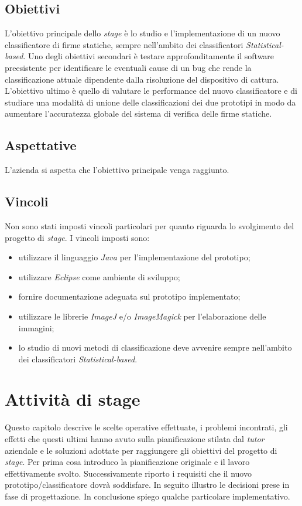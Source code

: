 \subsection{Obiettivi}
\label{2.2}
L'obiettivo principale dello \emph{stage} è lo studio e l'implementazione di un nuovo classificatore di firme statiche, sempre nell'ambito dei classificatori \emph{Statistical-based}. Uno degli obiettivi secondari è testare approfonditamente il software preesistente per identificare le eventuali cause di un bug che rende la classificazione attuale dipendente dalla risoluzione del dispositivo di cattura. L'obiettivo ultimo è quello di valutare le performance del nuovo classificatore e di studiare una modalità di unione delle classificazioni dei due prototipi in modo da aumentare l'accuratezza globale del sistema di verifica delle firme statiche.
\subsection{Aspettative}
\label{2.3}
L'azienda si aspetta che l'obiettivo principale venga raggiunto.
\subsection{Vincoli}
\label{2.4}
Non sono stati imposti vincoli particolari per quanto riguarda lo svolgimento del progetto di \emph{stage}. I vincoli imposti sono:
\begin{itemize}
\item utilizzare il linguaggio \emph{Java} per l'implementazione del prototipo;
\item utilizzare \emph{Eclipse} come ambiente di sviluppo;
\item fornire documentazione adeguata sul prototipo implementato;
\item utilizzare le librerie \emph{ImageJ} e/o \emph{ImageMagick} per l'elaborazione delle immagini;
\item lo studio di nuovi metodi di classificazione deve avvenire sempre nell'ambito dei classificatori \emph{Statistical-based}.
\end{itemize}

\newpage

\section{Attività di stage}
\label{3.0}
Questo capitolo descrive le scelte operative effettuate, i problemi incontrati, gli effetti che questi ultimi hanno avuto sulla pianificazione stilata dal \emph{tutor} aziendale e le soluzioni adottate per raggiungere gli obiettivi del progetto di \emph{stage}. Per prima cosa introduco la pianificazione originale e il lavoro effettivamente svolto. Successivamente riporto i requisiti che il nuovo prototipo/classificatore dovrà soddisfare. In seguito illustro le decisioni prese in fase di progettazione. In conclusione spiego qualche particolare implementativo.
